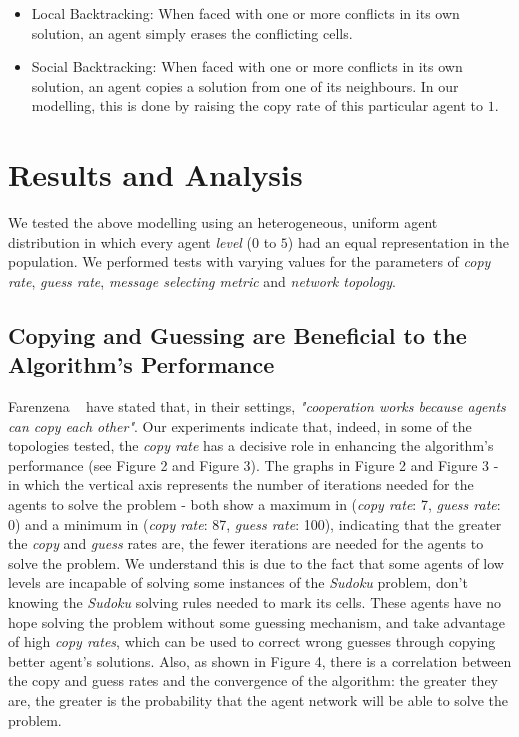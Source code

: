 \documentclass[letterpaper]{article}
\begin{document}
\begin{itemize}

\item
Local Backtracking: When faced with one or more conflicts in its own solution, an agent simply erases the conflicting cells.
\item
Social Backtracking: When faced with one or more conflicts in its own solution, an agent copies a solution from one of its neighbours. In our modelling, this is done by raising the copy rate of this particular agent to $1$.

\end{itemize}


\section{Results and Analysis}

We tested the above modelling using an heterogeneous, uniform agent distribution in which every agent {\em level} ($0$ to $5$) had an equal representation in the population. We performed tests with varying values for the parameters of {\em copy rate}, {\em guess rate}, {\em message selecting metric} and {\em network topology}.

\subsection{Copying and Guessing are Beneficial to the Algorithm's Performance}

Farenzena ~\cite{farenzena:collabem} have stated that, in their settings, {\em "cooperation works because agents can copy each other"}. Our experiments indicate that, indeed, in some of the topologies tested, the {\em copy rate} has a decisive role in enhancing the algorithm's performance (see Figure 2 and Figure 3). The graphs in Figure 2 and Figure 3 - in which the vertical axis represents the number of iterations needed for the agents to solve the problem - both show a maximum in ({\em copy rate}: 7, {\em guess rate}: 0) and a minimum in ({\em copy rate}: 87, {\em guess rate}: 100), indicating that the greater the {\em copy} and {\em guess} rates are, the fewer iterations are needed for the agents to solve the problem. We understand this is due to the fact that some agents of low levels are incapable of solving some instances of the {\em Sudoku} problem, don't knowing the {\em Sudoku} solving rules needed to mark its cells. These agents have no hope solving the problem without some guessing mechanism, and take advantage of high {\em copy rates}, which can be used to correct wrong guesses through copying better agent's solutions. Also, as shown in Figure 4, there is a correlation between the copy and guess rates and the convergence of the algorithm: the greater they are, the greater is the probability that the agent network will be able to solve the problem.
\end{document}

